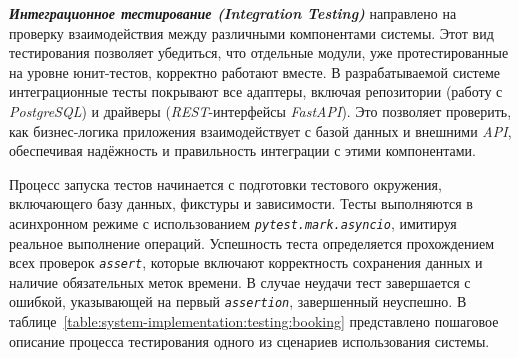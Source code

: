 \textit{\textbf{Интеграционное тестирование (Integration Testing)}} направлено на проверку взаимодействия между различными компонентами системы. Этот вид тестирования позволяет убедиться, что отдельные модули, уже протестированные на уровне юнит-тестов, корректно работают вместе. В разрабатываемой системе интеграционные тесты покрывают все адаптеры, включая репозитории (работу с \textit{PostgreSQL}) и драйверы (\textit{REST}-интерфейсы \textit{FastAPI}). Это позволяет проверить, как бизнес-логика приложения взаимодействует с базой данных и внешними \textit{API}, обеспечивая надёжность и правильность интеграции с этими компонентами.

Процесс запуска тестов начинается с подготовки тестового окружения, включающего базу данных, фикстуры и зависимости. Тесты выполняются в асинхронном режиме с использованием \textit{\lstinline!pytest.mark.asyncio!}, имитируя реальное выполнение операций. Успешность теста определяется прохождением всех проверок \textit{\lstinline!assert!}, которые включают корректность сохранения данных и наличие обязательных меток времени. В случае неудачи тест завершается с ошибкой, указывающей на первый \textit{\lstinline!assertion!}, завершенный неуспешно. В таблице~\ref{table:system-implementation:testing:booking} представлено пошаговое описание процесса тестирования одного из сценариев использования системы.

